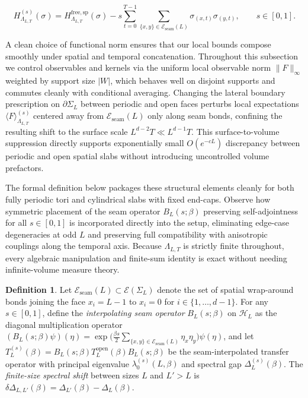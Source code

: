 \documentclass[11pt]{article}
\theoremstyle{definition}
\newtheorem{definition}[theorem]{Definition}
\begin{document}
\[
  H_{\Lambda_{L,T}}^{(s)}(\sigma) = H_{\Lambda_{L,T}}^{\mathrm{free,sp}}(\sigma) - s \sum_{t=0}^{T-1} \sum_{\{x,y\} \in \mathcal{E}_{\mathrm{seam}}(L)} \sigma_{(x,t)} \sigma_{(y,t)}, \qquad s \in [0, 1].
\]

A clean choice of functional norm ensures that our local bounds compose smoothly
under spatial and temporal concatenation. Throughout this subsection we control
observables and kernels via the uniform local observable norm $\|F\|_\infty$
weighted by support size $|W|$, which behaves well on disjoint supports and commutes
cleanly with conditional averaging. Changing the lateral boundary prescription on
$\partial \Sigma_L$ between periodic and open faces perturbs local expectations
$\langle F \rangle_{\Lambda_{L,T}}^{(s)}$ centered away from
$\mathcal{E}_{\mathrm{seam}}(L)$ only along seam bonds, confining the resulting
shift to the surface scale $L^{d-2} T \ll L^{d-1} T$. This surface-to-volume
suppression directly supports exponentially small $O(e^{-c L})$ discrepancy between
periodic and open spatial slabs without introducing uncontrolled volume prefactors.

The formal definition below packages these structural elements cleanly for both
fully periodic tori and cylindrical slabs with fixed end-caps. Observe how symmetric
placement of the seam operator $B_L(s; \beta)$ preserving self-adjointness for all
$s \in [0, 1]$ is incorporated directly into the setup, eliminating edge-case
degeneracies at odd $L$ and preserving full compatibility with anisotropic couplings
along the temporal axis. Because $\Lambda_{L,T}$ is strictly finite throughout,
every algebraic manipulation and finite-sum identity is exact without needing
infinite-volume measure theory.

\begin{definition}
\label{def:s09-torus-defect}
Let $\mathcal{E}_{\mathrm{seam}}(L) \subset \mathcal{E}(\Sigma_L)$ denote the set of
spatial wrap-around bonds joining the face $x_i = L - 1$ to $x_i = 0$ for $i \in
\{1, \dots, d - 1\}$. For any $s \in [0, 1]$, define the \emph{interpolating seam
operator} $B_L(s; \beta)$ on $\mathcal{H}_L$ as the diagonal multiplication operator
$(B_L(s; \beta) \psi)(\eta) = \exp\!\bigl(\frac{\beta s}{2} \sum_{\{x,y\} \in
\mathcal{E}_{\mathrm{seam}}(L)} \eta_x \eta_y\bigr) \psi(\eta)$, and let
$T_L^{(s)}(\beta) = B_L(s; \beta) T_L^{\mathrm{open}}(\beta) B_L(s; \beta)$ be the
seam-interpolated transfer operator with principal eigenvalue $\lambda_0^{(s)}(L,
\beta)$ and spectral gap $\Delta_L^{(s)}(\beta)$. The \emph{finite-size spectral
shift} between sizes $L$ and $L' > L$ is $\delta \Delta_{L, L'}(\beta) =
\Delta_{L'}(\beta) - \Delta_L(\beta)$.
\end{definition}
\end{document}
